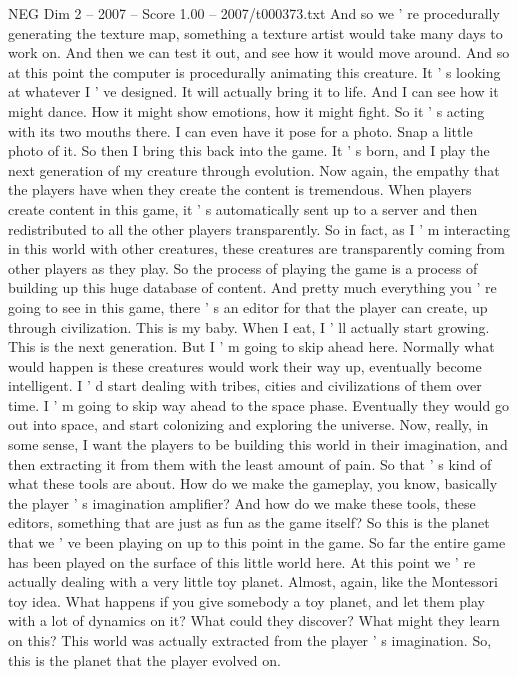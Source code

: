 \begin{textsample}{NEG Dim 2 – 2007 – Score 1.00 – 2007/t000373.txt}
And so we ' re procedurally generating the texture map, something a texture artist would take many days to work on.
And then we can test it out, and see how it would move around.
And so at this point the computer is procedurally animating this creature.
It ' s looking at whatever I ' ve designed.
It will actually bring it to life.
And I can see how it might dance.
How it might show emotions, how it might fight.
So it ' s acting with its two mouths there.
I can even have it pose for a photo.
Snap a little photo of it.
So then I bring this back into the game.
It ' s born, and I play the next generation of my creature through evolution.
Now again, the empathy that the players have when they create the content is tremendous.
When players create content in this game, it ' s automatically sent up to a server and then redistributed to all the other players transparently.
So in fact, as I ' m interacting in this world with other creatures, these creatures are transparently coming from other players as they play.
So the process of playing the game is a process of building up this huge database of content.
And pretty much everything you ' re going to see in this game, there ' s an editor for that the player can create, up through civilization.
This is my baby.
When I eat, I ' ll actually start growing.
This is the next generation.
But I ' m going to skip ahead here.
Normally what would happen is these creatures would work their way up, eventually become intelligent.
I ' d start dealing with tribes, cities and civilizations of them over time.
I ' m going to skip way ahead to the space phase.
Eventually they would go out into space, and start colonizing and exploring the universe.
Now, really, in some sense, I want the players to be building this world in their imagination, and then extracting it from them with the least amount of pain.
So that ' s kind of what these tools are about.
How do we make the gameplay, you know, basically the player ' s imagination amplifier?
And how do we make these tools, these editors, something that are just as fun as the game itself?
So this is the planet that we ' ve been playing on up to this point in the game.
So far the entire game has been played on the surface of this little world here.
At this point we ' re actually dealing with a very little toy planet.
Almost, again, like the Montessori toy idea.
What happens if you give somebody a toy planet, and let them play with a lot of dynamics on it?
What could they discover?
What might they learn on this?
This world was actually extracted from the player ' s imagination.
So, this is the planet that the player evolved on.

\end{textsample}
